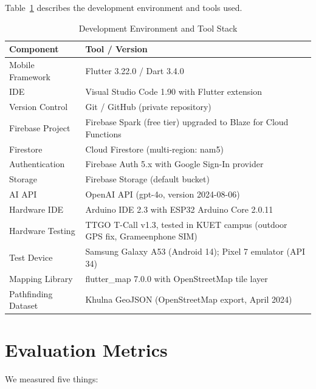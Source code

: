 \documentclass[12pt,a4paper]{report}
\begin{document}
Table~\ref{tab:devenv} describes the development environment and tools used.

\begin{table}[t]
\caption{Development Environment and Tool Stack}
\label{tab:devenv}
\centering
\begin{tabularx}{\linewidth}{lX}
\toprule
\textbf{Component} & \textbf{Tool / Version}\\
\midrule
Mobile Framework      & Flutter 3.22.0 / Dart 3.4.0 \\
IDE                   & Visual Studio Code 1.90 with Flutter extension \\
Version Control       & Git / GitHub (private repository) \\
Firebase Project      & Firebase Spark (free tier) upgraded to Blaze for Cloud Functions \\
Firestore             & Cloud Firestore (multi-region: nam5) \\
Authentication        & Firebase Auth 5.x with Google Sign-In provider \\
Storage               & Firebase Storage (default bucket) \\
AI API                & OpenAI API (gpt-4o, version 2024-08-06) \\
Hardware IDE          & Arduino IDE 2.3 with ESP32 Arduino Core 2.0.11 \\
Hardware Testing      & TTGO T-Call v1.3, tested in KUET campus (outdoor GPS fix, Grameenphone SIM) \\
Test Device           & Samsung Galaxy A53 (Android 14); Pixel 7 emulator (API 34) \\
Mapping Library       & flutter\_map 7.0.0 with OpenStreetMap tile layer \\
Pathfinding Dataset   & Khulna GeoJSON (OpenStreetMap export, April 2024) \\
\bottomrule
\end{tabularx}
\end{table}

\section{Evaluation Metrics}

We measured five things:
\end{document}

